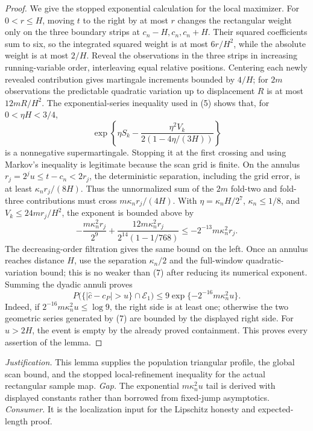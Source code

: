 \documentclass{article}
\begin{document}
\begin{proof}
We give the stopped exponential calculation for the local maximizer.
For \(0<r\le H\), moving \(t\) to the right by at most \(r\) changes
the rectangular weight only on the three boundary strips at
\(c_n-H,c_n,c_n+H\).  Their squared coefficients sum to six, so the
integrated squared weight is at most \(6r/H^2\), while the absolute
weight is at most \(2/H\).  Reveal the observations in the three
strips in increasing running-variable order, interleaving equal
relative positions.  Centering each newly revealed contribution gives
martingale increments bounded by \(4/H\); for \(2m\) observations the
predictable quadratic variation up to displacement \(R\) is at most
\(12mR/H^2\).  The exponential-series inequality used in (5) shows
that, for \(0<\eta H<3/4\),
\[
 \exp\left\{\eta S_k-
 \frac{\eta^2V_k}{2(1-4\eta/(3H))}\right\}
\]
is a nonnegative supermartingale.  Stopping it at the first crossing
and using Markov's inequality is legitimate because the scan grid is
finite.  On the annulus \(r_j=2^ju\le t-c_n<2r_j\), the deterministic
separation, including the grid error, is at least
\(\kappa_nr_j/(8H)\).  Thus the unnormalized sum of the \(2m\)
fold-two and fold-three contributions must cross
\(m\kappa_nr_j/(4H)\).  With \(\eta=\kappa_nH/2^7\),
\(\kappa_n\le1/8\), and \(V_k\le24mr_j/H^2\), the exponent is bounded
above by
\[
 -\frac{m\kappa_n^2r_j}{2^9}
 +\frac{12m\kappa_n^2r_j}
 {2^{14}(1-1/768)}
 \le-2^{-13}m\kappa_n^2r_j. \tag{7}
\]
The decreasing-order filtration gives the same bound on the left.
Once an annulus reaches distance \(H\), use the separation
\(\kappa_n/2\) and the full-window quadratic-variation bound; this is
no weaker than (7) after reducing its numerical exponent.  Summing the
dyadic annuli proves
\[
 P\bigl(\{|\widehat c-c_P|>u\}\cap\mathcal E_1\bigr)
 \le9\exp\{-2^{-16}m\kappa_n^2u\}.
\]
Indeed, if \(2^{-16}m\kappa_n^2u\le\log9\), the right side is at least
one; otherwise the two geometric series generated by (7) are bounded
by the displayed right side.  For \(u>2H\), the event is empty by the
already proved containment.  This proves every assertion of the lemma.
\end{proof}
\par\smallskip\noindent \textit{Justification.} This lemma supplies the population triangular profile, the global scan bound, and the stopped local-refinement inequality for the actual rectangular sample map. \textit{Gap.} The exponential \(m\kappa_n^2u\) tail is derived with displayed constants rather than borrowed from fixed-jump asymptotics. \textit{Consumer.} It is the localization input for the Lipschitz honesty and expected-length proof.
\end{document}
